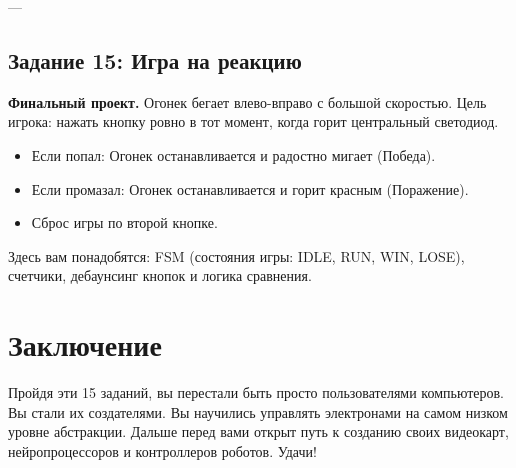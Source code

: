 \documentclass[12pt, a4paper]{article}
\begin{document}
---

\subsection{Задание 15: Игра на реакцию}
\textbf{Финальный проект.}
Огонек бегает влево-вправо с большой скоростью.
Цель игрока: нажать кнопку ровно в тот момент, когда горит центральный светодиод.
\begin{itemize}
    \item Если попал: Огонек останавливается и радостно мигает (Победа).
    \item Если промазал: Огонек останавливается и горит красным (Поражение).
    \item Сброс игры по второй кнопке.
\end{itemize}
Здесь вам понадобятся: FSM (состояния игры: IDLE, RUN, WIN, LOSE), счетчики, дебаунсинг кнопок и логика сравнения.

\section{Заключение}
Пройдя эти 15 заданий, вы перестали быть просто пользователями компьютеров. Вы стали их создателями. Вы научились управлять электронами на самом низком уровне абстракции.
Дальше перед вами открыт путь к созданию своих видеокарт, нейропроцессоров и контроллеров роботов. Удачи!
\end{document}
